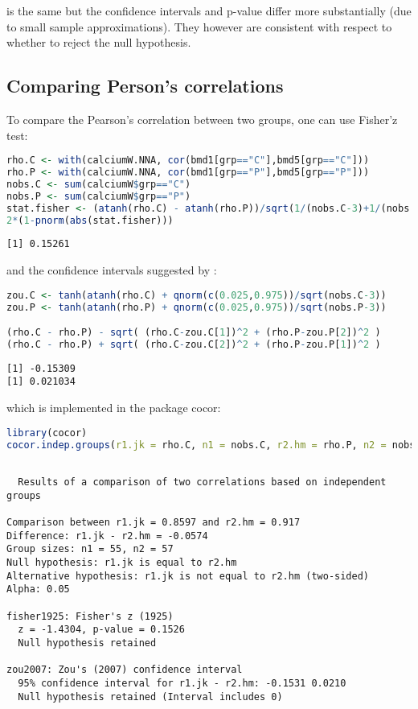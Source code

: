 \documentclass[12pt]{article}
\begin{document}
is the same but the confidence intervals and p-value differ more
substantially (due to small sample approximations). They however are
consistent with respect to whether to reject the null hypothesis.

\clearpage
\subsection{Comparing Person's correlations}
\label{sec:orgbc78b3d}

To compare the Pearson's correlation between two groups, one can use
Fisher'z test:
\begin{lstlisting}[language=r,numbers=none]
rho.C <- with(calciumW.NNA, cor(bmd1[grp=="C"],bmd5[grp=="C"]))
rho.P <- with(calciumW.NNA, cor(bmd1[grp=="P"],bmd5[grp=="P"]))
nobs.C <- sum(calciumW$grp=="C")
nobs.P <- sum(calciumW$grp=="P")
stat.fisher <- (atanh(rho.C) - atanh(rho.P))/sqrt(1/(nobs.C-3)+1/(nobs.P-3))
2*(1-pnorm(abs(stat.fisher)))
\end{lstlisting}

\label{}
\begin{verbatim}
[1] 0.15261
\end{verbatim}


and the confidence intervals suggested by \cite{zou2007toward}:
\begin{lstlisting}[language=r,numbers=none]
zou.C <- tanh(atanh(rho.C) + qnorm(c(0.025,0.975))/sqrt(nobs.C-3))
zou.P <- tanh(atanh(rho.P) + qnorm(c(0.025,0.975))/sqrt(nobs.P-3))

(rho.C - rho.P) - sqrt( (rho.C-zou.C[1])^2 + (rho.P-zou.P[2])^2 )
(rho.C - rho.P) + sqrt( (rho.C-zou.C[2])^2 + (rho.P-zou.P[1])^2 )
\end{lstlisting}

\label{}
\begin{verbatim}
[1] -0.15309
[1] 0.021034
\end{verbatim}


which is implemented in the package cocor:
\begin{lstlisting}[language=r,numbers=none]
library(cocor)
cocor.indep.groups(r1.jk = rho.C, n1 = nobs.C, r2.hm = rho.P, n2 = nobs.P)
\end{lstlisting}

\label{}
\begin{verbatim}

  Results of a comparison of two correlations based on independent groups

Comparison between r1.jk = 0.8597 and r2.hm = 0.917
Difference: r1.jk - r2.hm = -0.0574
Group sizes: n1 = 55, n2 = 57
Null hypothesis: r1.jk is equal to r2.hm
Alternative hypothesis: r1.jk is not equal to r2.hm (two-sided)
Alpha: 0.05

fisher1925: Fisher's z (1925)
  z = -1.4304, p-value = 0.1526
  Null hypothesis retained

zou2007: Zou's (2007) confidence interval
  95% confidence interval for r1.jk - r2.hm: -0.1531 0.0210
  Null hypothesis retained (Interval includes 0)
\end{verbatim}
\end{document}
